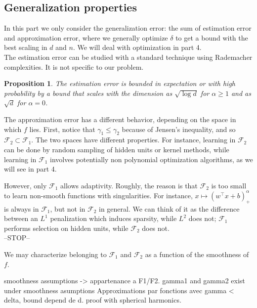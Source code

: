 \documentclass[a4paper, 11pt]{scrartcl}
\newtheorem{proposition}{Proposition}[section]
\begin{document}
\subsection{Generalization properties}

In this part we only consider the generalization error: the sum of estimation error and approximation error, where we generally optimize $\delta$ to get a bound with the best scaling in $d$ and $n$. We will deal with optimization in part 4.\\

The estimation error can be studied with a standard technique using Rademacher complexities. It is not specific to our problem.

\begin{proposition}
The estimation error is bounded in expectation or with high probability by a bound that scales with the dimension as $\sqrt{\log d}$ for $\alpha \geq 1$ and as $\sqrt{d}$ for $\alpha = 0$.
\end{proposition}

The approximation error has a different behavior, depending on the space in which $f$ lies. First, notice that $\gamma_1 \leq \gamma_2$ because of Jensen's inequality, and so $\mathcal{F}_2 \subset \mathcal{F}_1$. The two spaces have different properties. For instance, learning in $\mathcal{F}_2$ can be done by random sampling of hidden units or kernel methods, while learning in $\mathcal{F}_1$ involves potentially non polynomial optimization algorithms, as we will see in part 4.

However, only $\mathcal{F}_1$ allows adaptivity. Roughly, the reason is that $\mathcal{F}_2$ is too small to learn non-smooth functions with singularities. For instance, $x\mapsto (w^\top x+b)^\alpha_+$ is always in $\mathcal{F}_1$, but not in $\mathcal{F}_2$ in general. We can think of it as the difference between an $L^1$ penalization which induces sparsity, while $L^2$ does not; $\mathcal{F}_1$ performs selection on hidden units, while $\mathcal{F}_2$ does not.\\

--STOP--


We may characterize belonging to $\mathcal{F}_1$ and $\mathcal{F}_2$ as a function of the smoothness of $f$.

smoothness assumptions -> appartenance a F1/F2. 
gamma1 and gamma2 exist under smoothness asumptions Approximations par fonctions avec gamma < delta, bound depend de d. proof with spherical harmonics.
\end{document}
